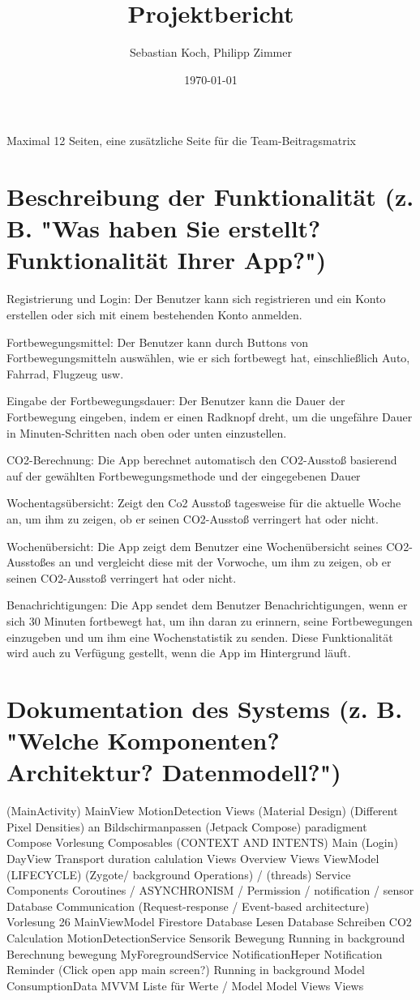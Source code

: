 \documentclass[a4paper,11pt]{article}
\title{Projektbericht}
\author{Sebastian Koch, Philipp Zimmer}
\date{\today}
\begin{document}
\maketitle
\tableofcontents

Maximal 12 Seiten, eine zusätzliche Seite für die Team-Beitragsmatrix


\section{Beschreibung der Funktionalität (z. B. "Was haben Sie erstellt? Funktionalität Ihrer App?")}
Registrierung und Login: Der Benutzer kann sich registrieren und ein Konto erstellen oder sich mit einem bestehenden Konto anmelden.

Fortbewegungsmittel: Der Benutzer kann durch Buttons von Fortbewegungsmitteln auswählen, wie er sich fortbewegt hat, einschließlich Auto, Fahrrad, Flugzeug usw. 

Eingabe der Fortbewegungsdauer: Der Benutzer kann die Dauer der Fortbewegung eingeben, indem er einen Radknopf dreht, um die ungefähre Dauer in Minuten-Schritten nach oben oder unten einzustellen.

CO2-Berechnung: Die App berechnet automatisch den CO2-Ausstoß basierend auf der gewählten Fortbewegungsmethode und der eingegebenen Dauer

Wochentagsübersicht:
Zeigt den Co2 Ausstoß tagesweise für die aktuelle Woche an, um ihm zu zeigen, ob er seinen CO2-Ausstoß verringert hat oder nicht.

Wochenübersicht: Die App zeigt dem Benutzer eine Wochenübersicht seines CO2-Ausstoßes an und vergleicht diese mit der Vorwoche, um ihm zu zeigen, ob er seinen CO2-Ausstoß verringert hat oder nicht.

Benachrichtigungen: Die App sendet dem Benutzer Benachrichtigungen, wenn er sich 30 Minuten fortbewegt hat, um ihn daran zu erinnern, seine Fortbewegungen einzugeben und um ihm eine Wochenstatistik zu senden. Diese Funktionalität wird auch zu Verfügung gestellt, wenn die App im Hintergrund läuft.


\section{Dokumentation des Systems (z. B. "Welche Komponenten? Architektur? Datenmodell?")}
(MainActivity)
	MainView
	MotionDetection
Views
	(Material Design)
	(Different Pixel Densities) an Bildschirmanpassen
	(Jetpack Compose) paradigment Compose Vorlesung
	Composables
	(CONTEXT AND INTENTS)
	Main
	(Login)
	DayView
	Transport duration calulation Views
	Overview Views
ViewModel
	(LIFECYCLE)
	(Zygote/ background Operations) / (threads)
	Service Components
	Coroutines / ASYNCHRONISM / Permission / notification / sensor
	Database
	Communication (Request-response / Event-based architecture) Vorlesung 26
	MainViewModel
	Firestore
		Database Lesen
		Database Schreiben
	CO2 Calculation
	MotionDetectionService
		Sensorik
			Bewegung
			Running in background
			Berechnung bewegung
	MyForegroundService
	NotificationHeper
		Notification
			Reminder
			(Click open app main screen?)
			Running in background
Model
	ConsumptionData
MVVM
	Liste für Werte / Model
	Model Views
	Views
\end{document}
